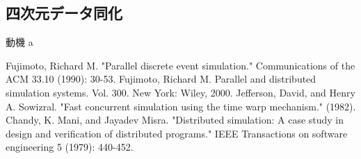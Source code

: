\documentclass[dvipdfmx,uplatex,11pt]{beamer}
\theoremstyle{definition}
\begin{document}
 \subsection{四次元データ同化}
\begin{frame}{動機}
  a
\end{frame}

\begin{thebibliography}{n}
   Fujimoto, Richard M. "Parallel discrete event simulation." Communications of the ACM 33.10 (1990): 30-53.
   Fujimoto, Richard M. Parallel and distributed simulation systems. Vol. 300. New York: Wiley, 2000.
   Jefferson, David, and Henry A. Sowizral. "Fast concurrent simulation using the time warp mechanism." (1982).
   Chandy, K. Mani, and Jayadev Misra. "Distributed simulation: A case study in design and verification of distributed programs." IEEE Transactions on software engineering 5 (1979): 440-452.
\end{thebibliography}
\end{document}
